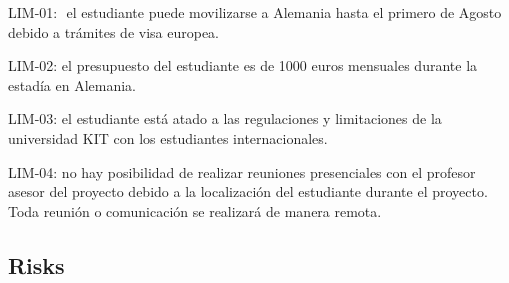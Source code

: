 LIM-01: ​ el estudiante puede movilizarse a Alemania hasta el primero de Agosto debido a trámites de
visa europea.

LIM-02:​ el presupuesto del estudiante es de 1000 euros mensuales durante la estadía en Alemania.

LIM-03: el estudiante está atado a las regulaciones y limitaciones de la universidad KIT con los
estudiantes internacionales.

LIM-04: no hay posibilidad de realizar reuniones presenciales con el profesor asesor del proyecto debido a
la localización del estudiante durante el proyecto. Toda reunión o comunicación se realizará de manera
remota.

\subsection{Risks}


